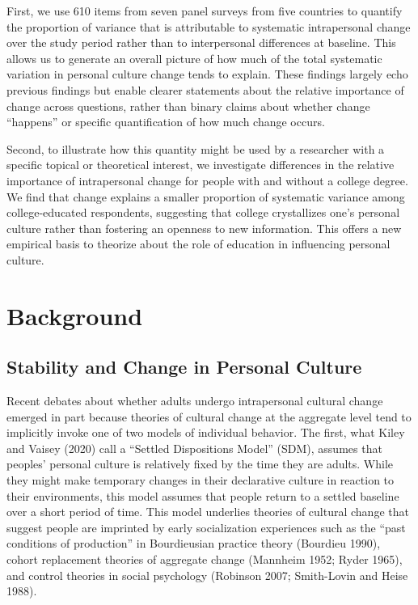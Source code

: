 \documentclass[
  11pt,
]{article}
\begin{document}
First, we use 610 items from seven panel surveys from five countries to
quantify the proportion of variance that is attributable to systematic
intrapersonal change over the study period rather than to interpersonal
differences at baseline. This allows us to generate an overall picture
of how much of the total systematic variation in personal culture change
tends to explain. These findings largely echo previous findings but
enable clearer statements about the relative importance of change across
questions, rather than binary claims about whether change ``happens'' or
specific quantification of how much change occurs.

Second, to illustrate how this quantity might be used by a researcher
with a specific topical or theoretical interest, we investigate
differences in the relative importance of intrapersonal change for
people with and without a college degree. We find that change explains a
smaller proportion of systematic variance among college-educated
respondents, suggesting that college crystallizes one's personal culture
rather than fostering an openness to new information. This offers a new
empirical basis to theorize about the role of education in influencing
personal culture.

\section{Background}\label{background}

\subsection{Stability and Change in Personal
Culture}\label{stability-and-change-in-personal-culture}

Recent debates about whether adults undergo intrapersonal cultural
change emerged in part because theories of cultural change at the
aggregate level tend to implicitly invoke one of two models of
individual behavior. The first, what Kiley and Vaisey (2020) call a
``Settled Dispositions Model'' (SDM), assumes that peoples' personal
culture is relatively fixed by the time they are adults. While they
might make temporary changes in their declarative culture in reaction to
their environments, this model assumes that people return to a settled
baseline over a short period of time. This model underlies theories of
cultural change that suggest people are imprinted by early socialization
experiences such as the ``past conditions of production'' in
Bourdieusian practice theory (Bourdieu 1990), cohort replacement
theories of aggregate change (Mannheim 1952; Ryder 1965), and control
theories in social psychology (Robinson 2007; Smith-Lovin and Heise
1988).
\end{document}
